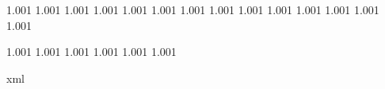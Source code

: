 




\chardef{}
\chardef{}

\newtoks\everywritestring

\def\writedirect  {\immediate\write\statuswrite}
\def\writeline    {\writedirect{}}
\def\writestring#1{\begingroup\the\everywritestring\writedirect{#1}\endgroup}

\ifx\normalmessage    \undefined \let\normalmessage         \message               \fi
\ifx\normalwritestatus\undefined \def\normalwritestatus#1#2{\writedirect{#1 : #2}} \fi


 {1.001}
 {1.001}
   {1.001}
  {1.001}
    {1.001}
    {1.001}
     {1.001}
     {1.001}
   {1.001}
    {1.001}
  {1.001}
    {1.001}
    {1.001}
 {1.001}

 {1.001}
 {1.001}
 {1.001}
 {1.001}
 {1.001}
 {1.001}

\startruntimeluacode
    \edef\asciia{}
    \edef\asciib{xml}
    \ifx\asciia\asciib %
        \long\def\writebanner  #1{\writestring  {<m t='banner'>#1</m>}}
        \long\def\writestatus#1#2{\writestring  {<m t='#1'>#2</m>}}
        \long\def\message      #1{\normalmessage{<m t='message'>#1</m>}}
    \else
        \let\writebanner\writestring
        \let\writestatus\normalwritestatus
        \let\message    \normalmessage
    \fi
\stopruntimeluacode


